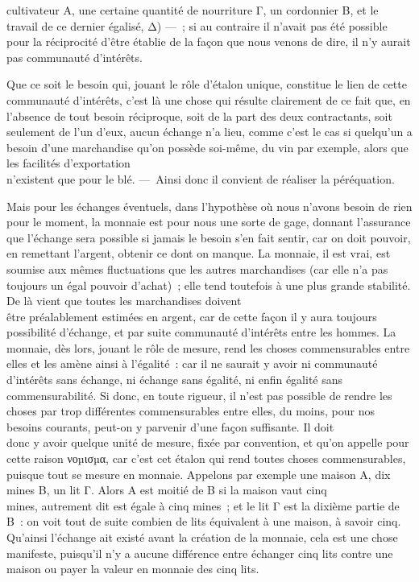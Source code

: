 \documentclass[french,twoside]{book} %
\begin{document}
cultivateur A, une certaine quantité de nourriture Γ, un cordonnier B, et le travail de ce dernier égalisé, Δ) — ; si au contraire il n’avait pas été possible pour la réciprocité d’être établie de la façon que nous venons de dire, il n’y aurait pas communauté d’intérêts.\par
Que ce soit le besoin qui, jouant le rôle d’étalon unique, constitue le lien de cette communauté d’intérêts, c’est là une chose qui résulte clairement de ce fait que, en l’absence de tout besoin réciproque, soit de la part des deux contractants, soit seulement de l’un d’eux, aucun échange n’a lieu, comme c’est le cas si quelqu’un a besoin d’une marchandise qu’on possède soi-même, du vin par exemple, alors que les facilités d’exportation \\
n’existent que pour le blé. — Ainsi donc il convient de réaliser la péréquation.\par
Mais pour les échanges éventuels, dans l’hypothèse où nous n’avons besoin de rien pour le moment, la monnaie est pour nous une sorte de gage, donnant l’assurance que l’échange sera possible si jamais le besoin s’en fait sentir, car on doit pouvoir, en remettant l’argent, obtenir ce dont on manque. La monnaie, il est vrai, est soumise aux mêmes fluctuations que les autres marchandises (car elle n’a pas toujours un égal pouvoir d’achat) ; elle tend toutefois à une plus grande stabilité. De là vient que toutes les marchandises doivent \\
être préalablement estimées en argent, car de cette façon il y aura toujours possibilité d’échange, et par suite communauté d’intérêts entre les hommes. La monnaie, dès lors, jouant le rôle de mesure, rend les choses commensurables entre elles et les amène ainsi à l’égalité : car il ne saurait y avoir ni communauté d’intérêts sans échange, ni échange sans égalité, ni enfin égalité sans commensurabilité. Si donc, en toute rigueur, il n’est pas possible de rendre les choses par trop différentes commensurables entre elles, du moins, pour nos besoins courants, peut-on y parvenir d’une façon suffisante. Il doit \\
donc y avoir quelque unité de mesure, fixée par convention, et qu’on appelle pour cette raison νοµισµα, car c’est cet étalon qui rend toutes choses commensurables, puisque tout se mesure en monnaie. Appelons par exemple une maison A, dix mines B, un lit Γ. Alors A est moitié de B si la maison vaut cinq \\
mines, autrement dit est égale à cinq mines ; et le lit Γ est la dixième partie de B : on voit tout de suite combien de lits équivalent à une maison, à savoir cinq. Qu’ainsi l’échange ait existé avant la création de la monnaie, cela est une chose manifeste, puisqu’il n’y a aucune différence entre échanger cinq lits contre une maison ou payer la valeur en monnaie des cinq lits.
\end{document}
